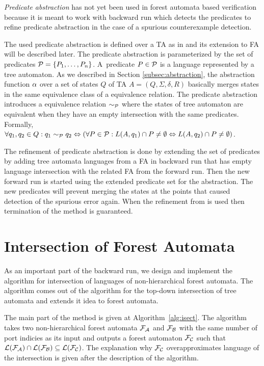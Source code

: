 \emph{Predicate abstraction} has not yet been used in forest automata based verification
because it is meant to work with backward run
which detects the predicates to refine predicate abstraction
in the case of a spurious counterexample detection.

The used predicate abstraction is defined over a TA as in \cite{artmc}
and its extension to FA will be described later.
The predicate abstraction is parameterized by the set of predicates $\mathcal{P}=\{P_1, \ldots, P_n\}$.
A~predicate $P \in \mathcal{P}$ is a language represented by
a tree automaton.
As we described in Section \ref{subsec:abstraction}, the abstraction function $\alpha$
over a set of states $Q$ of TA $A=(Q,\Sigma,\delta, R)$ basically
merges states in the same equivalence class of a equivalence relation.
The predicate abstraction introduces a equivalence relation $\sim_{\mathcal{P}}$
where the states of tree automaton are equivalent when
they have an empty intersection with the same predicates.
Formally, $\forall q_1,q_2 \in Q: q_1 \sim_{\mathcal{P}} q_2 \Leftrightarrow
(\forall P \in \mathcal{P}: L(A,q_1) \cap P \neq \emptyset
\Leftrightarrow L(A,q_2) \cap P \neq \emptyset)$.

The refinement of predicate abstraction is done by extending the
set of predicates by adding tree automata languages from
a FA in backward run that has empty language
intersection with the related FA from the forward run.
Then the new forward run is started using the extended predicate
set for the abstraction.
The new predicates will prevent merging the states at the points
that caused detection of the spurious error again.
When the refinement from \cite{artmc} is used
then termination of the method is guaranteed.

\section{Intersection of Forest Automata}
\label{sec:isect}
As an important part of the backward run,
we design and implement the algorithm for intersection
of languages of non-hierarchical forest automata.
The algorithm comes out of the algorithm for the top-down
intersection of tree automata and extends it idea to forest automata.

The main part of the method is given at Algorithm~\ref{alg:isect}.
The algorithm takes two non-hierarchical forest automata $\mathcal{F}_{\mathcal{A}}$
and $\mathcal{F}_{\mathcal{B}}$ with the same number of port indicies
as its input and outputs a forest automaton $\mathcal{F}_{\mathcal{C}}$ such that
$\mathcal{L}(\mathcal{F}_{\mathcal{A}}) \cap \mathcal{L}(\mathcal{F}_{\mathcal{B}}) \subseteq \mathcal{L}(\mathcal{F}_{\mathcal{C}})$.
The explanation why $\mathcal{F}_{\mathcal{C}}$ overapproximates language
of the intersection is given after the description of the algorithm.

